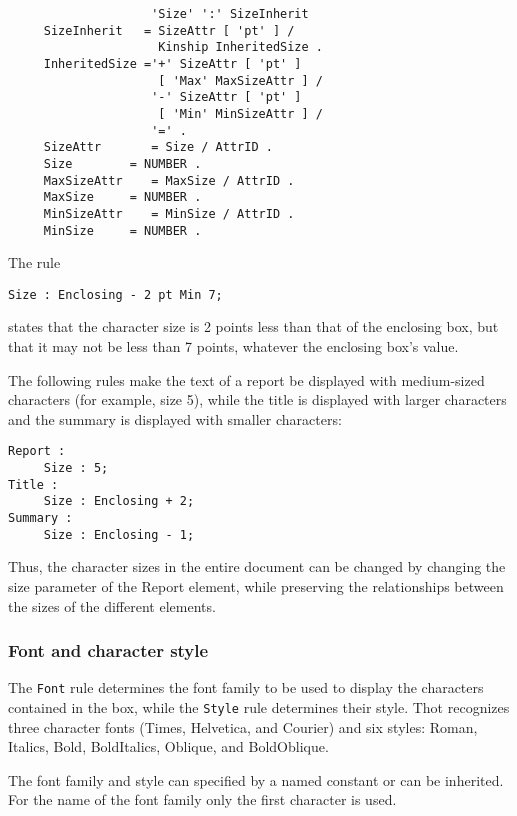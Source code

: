\begin{verbatim}
                    'Size' ':' SizeInherit
     SizeInherit   = SizeAttr [ 'pt' ] /
                     Kinship InheritedSize .
     InheritedSize ='+' SizeAttr [ 'pt' ]
                     [ 'Max' MaxSizeAttr ] /
                    '-' SizeAttr [ 'pt' ]
                     [ 'Min' MinSizeAttr ] /
                    '=' .
     SizeAttr       = Size / AttrID .
     Size        = NUMBER .
     MaxSizeAttr    = MaxSize / AttrID .
     MaxSize     = NUMBER .
     MinSizeAttr    = MinSize / AttrID .
     MinSize     = NUMBER .
\end{verbatim}

\begin{example}
The rule 
\begin{verbatim}
Size : Enclosing - 2 pt Min 7;
\end{verbatim}
states that the character size is 2 points less than that of the
enclosing box, but that it may not be less than 7 points, whatever the
enclosing box's value.

The following rules make the text of a report be displayed with
medium-sized characters (for example, size 5), while the title is
displayed with larger characters and the summary is displayed with
smaller characters:

\begin{verbatim}
Report :
     Size : 5;
Title :
     Size : Enclosing + 2;
Summary :
     Size : Enclosing - 1;
\end{verbatim}
Thus, the character sizes in the entire document can be changed by
changing the size parameter of the Report element, while preserving
the relationships between the sizes of the different elements.
\end{example}

\subsubsection{Font and character style}
\label{style}

The {\tt Font} rule determines the font family to be used to display
the characters contained in the box, while the {\tt Style} rule
determines their style.  Thot recognizes three character fonts (Times,
Helvetica, and Courier) and six styles: Roman, Italics, Bold,
BoldItalics, Oblique, and BoldOblique.  

The font family and style can specified by a named constant or can be
inherited.  For the name of the font family only the first character
is used.

